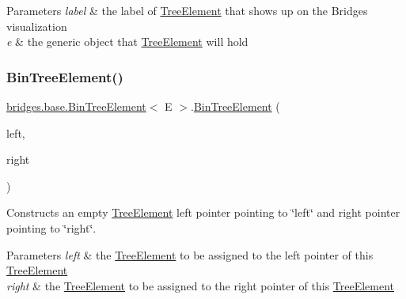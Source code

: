 \begin{DoxyParams}{Parameters}
{\em label} & the label of \hyperlink{classbridges_1_1base_1_1_tree_element}{Tree\+Element} that shows up on the Bridges visualization \\
\hline
{\em e} & the generic object that \hyperlink{classbridges_1_1base_1_1_tree_element}{Tree\+Element} will hold \\
\hline
\end{DoxyParams}
\hypertarget{classbridges_1_1base_1_1_bin_tree_element_ab402fac72353087b1b93e82db007e1d7}{}\label{classbridges_1_1base_1_1_bin_tree_element_ab402fac72353087b1b93e82db007e1d7} 
\subsubsection{\texorpdfstring{Bin\+Tree\+Element()}{BinTreeElement()}\hspace{0.1cm}{\footnotesize\ttfamily [4/5]}}
{\footnotesize\ttfamily \hyperlink{classbridges_1_1base_1_1_bin_tree_element}{bridges.\+base.\+Bin\+Tree\+Element}$<$ E $>$.\hyperlink{classbridges_1_1base_1_1_bin_tree_element}{Bin\+Tree\+Element} (\begin{DoxyParamCaption}\item[{\hyperlink{classbridges_1_1base_1_1_bin_tree_element}{Bin\+Tree\+Element}$<$ E $>$}]{left,  }\item[{\hyperlink{classbridges_1_1base_1_1_bin_tree_element}{Bin\+Tree\+Element}$<$ E $>$}]{right }\end{DoxyParamCaption})}

Constructs an empty \hyperlink{classbridges_1_1base_1_1_tree_element}{Tree\+Element} left pointer pointing to \char`\"{}left\char`\"{} and right pointer pointing to \char`\"{}right\char`\"{}. 
\begin{DoxyParams}{Parameters}
{\em left} & the \hyperlink{classbridges_1_1base_1_1_tree_element}{Tree\+Element} to be assigned to the left pointer of this \hyperlink{classbridges_1_1base_1_1_tree_element}{Tree\+Element} \\
\hline
{\em right} & the \hyperlink{classbridges_1_1base_1_1_tree_element}{Tree\+Element} to be assigned to the right pointer of this \hyperlink{classbridges_1_1base_1_1_tree_element}{Tree\+Element} \\
\hline
\end{DoxyParams}
\hypertarget{classbridges_1_1base_1_1_bin_tree_element_a37f3def3cdf4a9eccf577d0ff3c704e9}{}\label{classbridges_1_1base_1_1_bin_tree_element_a37f3def3cdf4a9eccf577d0ff3c704e9} 
